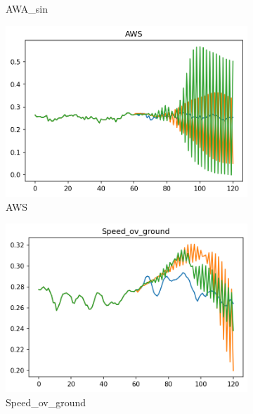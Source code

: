 \documentclass[12pt,twoside]{report}
\begin{document}
\begin{figure}[ht]
\begin{subfigure}[b]{0.32\textwidth}
         \caption{AWA\_sin}
     \end{subfigure}
     \begin{subfigure}[b]{0.32\textwidth}
         \centering
         \includegraphics[width=\textwidth]{figures/prediction-plots-joint/AWS.png}
         \caption{AWS}
     \end{subfigure}
     \begin{subfigure}[b]{0.32\textwidth}
         \centering
         \includegraphics[width=\textwidth]{figures/prediction-plots-joint/Speed_ov_ground.png}
         \caption{Speed\_ov\_ground}
     \end{subfigure}
     \begin{subfigure}[b]{0.32\textwidth}
         \centering

\end{subfigure}
\end{figure}
\end{document}

